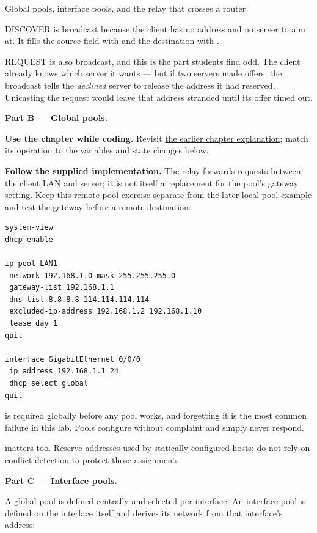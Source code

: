 \begin{labproject}{Global pools, interface pools, and the relay that crosses a router}
\begin{keyidea}
DISCOVER is broadcast because the client has no address and no server to aim at. It fills the source field with  and the destination with .

REQUEST is also broadcast, and this is the part students find odd. The client already knows which server it wants --- but if two servers made offers, the broadcast tells the \emph{declined} server to release the address it had reserved. Unicasting the request would leave that address stranded until its offer timed out.
\end{keyidea}

\medskip\noindent\textbf{Part B --- Global pools.}\par




\textbf{Use the chapter while coding.} Revisit \hyperref[ch:dhcp]{the earlier chapter explanation}; match its operation to the variables and state changes below.

\textbf{Follow the supplied implementation.} The relay forwards requests between the client LAN and server; it is not itself a replacement for the pool's gateway setting. Keep this remote-pool exercise separate from the later local-pool example and test the gateway before a remote destination.


\begin{lstlisting}[style=utpterminal]
system-view
dhcp enable

ip pool LAN1
 network 192.168.1.0 mask 255.255.255.0
 gateway-list 192.168.1.1
 dns-list 8.8.8.8 114.114.114.114
 excluded-ip-address 192.168.1.2 192.168.1.10
 lease day 1
quit

interface GigabitEthernet 0/0/0
 ip address 192.168.1.1 24
 dhcp select global
quit
\end{lstlisting}

\begin{pitfall}
 is required globally before any pool works, and forgetting it is the most common failure in this lab. Pools configure without complaint and simply never respond.

 matters too. Reserve addresses used by statically configured hosts; do not rely on conflict detection to protect those assignments.
\end{pitfall}

\medskip\noindent\textbf{Part C --- Interface pools.}\par
A global pool is defined centrally and selected per interface. An interface pool is defined on the interface itself and derives its network from that interface's address:


\end{labproject}
